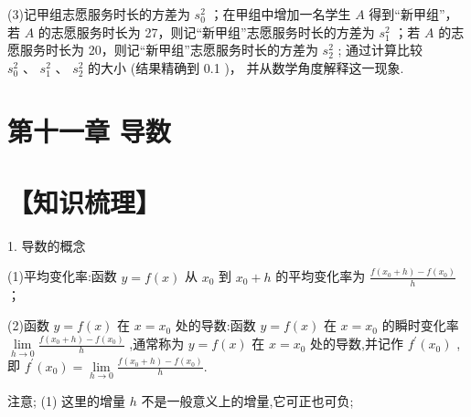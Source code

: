\documentclass[10pt]{article}
\begin{document}
(3)记甲组志愿服务时长的方差为 \({s}_{0}^{2}\) ；在甲组中增加一名学生 \(A\) 得到“新甲组”，若 \(A\) 的志愿服务时长为 27，则记“新甲组”志愿服务时长的方差为 \({s}_{1}^{2}\) ；若 \(A\) 的志愿服务时长为 20，则记“新甲组”志愿服务时长的方差为 \({s}_{2}^{2}\) ; 通过计算比较 \({s}_{0}^{2}\text{ 、 }{s}_{1}^{2}\text{ 、 }{s}_{2}^{2}\) 的大小 (结果精确到 0.1 )， 并从数学角度解释这一现象.

\begin{center}
\end{center}

\section*{第十一章 导数}

\section*{【知识梳理】}

1. 导数的概念

(1)平均变化率:函数 \(y = f\left( x\right)\) 从 \({x}_{0}\) 到 \({x}_{0} + h\) 的平均变化率为 \(\frac{f\left( {{x}_{0} + h}\right)  - f\left( {x}_{0}\right) }{h}\) ；

(2)函数 \(y = f\left( x\right)\) 在 \(x = {x}_{0}\) 处的导数:函数 \(y = f\left( x\right)\) 在 \(x = {x}_{0}\) 的瞬时变化率 \(\mathop{\lim }\limits_{{h \rightarrow  0}}\frac{f\left( {{x}_{0} + h}\right)  - f\left( {x}_{0}\right) }{h}\) ,通常称为 \(y = f\left( x\right)\) 在 \(x = {x}_{0}\) 处的导数,并记作 \({f}^{\prime }\left( {x}_{0}\right)\) ,即 \({f}^{\prime }\left( {x}_{0}\right)  = \mathop{\lim }\limits_{{h \rightarrow  0}}\frac{f\left( {{x}_{0} + h}\right)  - f\left( {x}_{0}\right) }{h}.\)

注意; (1) 这里的增量 \(h\) 不是一般意义上的增量,它可正也可负;
\end{document}
